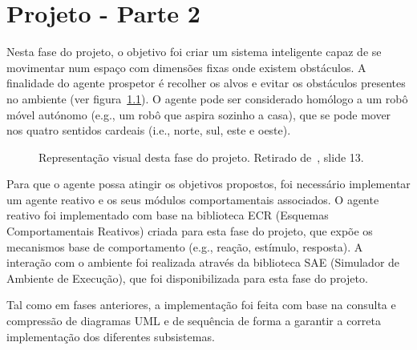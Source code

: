 \chapter{Projeto - Parte 2}\label{ch:projeto-parte2}

Nesta fase do projeto, o objetivo foi criar um sistema inteligente capaz de se movimentar num espaço com dimensões fixas onde existem obstáculos.
A finalidade do agente prospetor é recolher os alvos e evitar os obstáculos presentes no ambiente (ver figura~\ref{fig:agente-prospetor}).
O agente pode ser considerado homólogo a um robô móvel autónomo (e.g., um robô que aspira sozinho a casa), que se pode mover nos quatro sentidos cardeais (i.e., norte, sul, este e oeste).

\begin{figure}[H]
    \begin{center}
    \end{center}
    \caption{Representação visual desta fase do projeto.
    Retirado de~\cite{isel:iasa:slides:arq-agentes-reativos-parte-2}, slide 13.}\label{fig:agente-prospetor}
\end{figure}

Para que o agente possa atingir os objetivos propostos, foi necessário implementar um agente reativo e os seus módulos comportamentais associados.
O agente reativo foi implementado com base na biblioteca ECR (Esquemas Comportamentais Reativos) criada para esta fase do projeto, que expõe os mecanismos base de comportamento (e.g., reação, estímulo, resposta).
A interação com o ambiente foi realizada através da biblioteca SAE (Simulador de Ambiente de Execução),
que foi disponibilizada para esta fase do projeto.

Tal como em fases anteriores, a implementação foi feita com base na consulta e compressão de diagramas UML e de sequência de forma a garantir a correta implementação dos diferentes subsistemas.


